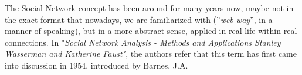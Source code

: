 \hfill \break

The Social Network concept has been around for many years now, maybe not in the exact format that nowadays, we are familiarized with (''\textit{web way}'', in a manner of speaking), but in a more abstract sense, applied in real life within real connections.
In "\textit{Social Network Analysis - Methods and Applications Stanley Wasserman and Katherine Faust"}, the authors refer that this term has first came into discussion in 1954, introduced by Barnes, J.A.

\hfill \break

\hypertarget{barnes_norwegian_org}{}
